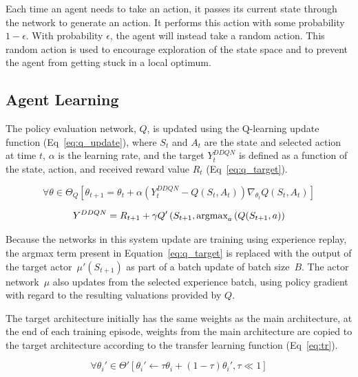 Each time an agent needs to take an action,
it passes its current state through the network to generate an action.
It performs this action with some probability $1 - \epsilon$.
With probability $\epsilon$, the agent will instead take a random action.
This random action is used to encourage exploration of the state space
and to prevent the agent from getting stuck in a local optimum.

\subsection{Agent Learning}
\label{subsec:farm_methods_learning}

The policy evaluation network, $Q$, is updated using the Q-learning
update function (Eq~\ref{eq:q_update}), where
$S_t$ and $A_t$ are the state and selected action at time $t$,
$\alpha$ is the learning rate,
and the target $Y_t^{DDQN}$ is defined as a function of the
state, action, and received reward value $R_t$ (Eq~\ref{eq:q_target}).

\begin{equation}
\label{eq:q_update}
    \forall \theta \in \Theta_Q \left[
    \theta_{t+1} = \theta_t + \alpha\left(
    Y_t^{DDQN} - Q(S_t, A_t)
    \right)
    \nabla_{\theta_t}Q(S_t,A_t)
    \right]
\end{equation}

\begin{equation}
\label{eq:q_target}
    Y^{DDQN} = 
        R_{t+1}
        + \gamma Q'\left(S_{t+1},\text{argmax}_{a}\left(Q(S_{t+1}, a\right)\right)
\end{equation}

Because the networks in this system update are training
using experience replay, the argmax term present in 
Equation~\ref{eq:q_target} is replaced with the output of the 
target actor~$\mu'(S_{t+1})$ as part of a batch update of 
batch size~$B$.
The actor network~$\mu$ also updates from the selected
experience batch, using policy gradient with regard to
the resulting valuations provided by $Q$.

The target architecture initially has the same weights as
the main architecture, at the end of each training episode,
weights from the main architecture are copied to the target
architecture according to the transfer learning function
(Eq~\ref{eq:tr}).

\begin{equation}
    \label{eq:tr}
    \forall\theta_i'\in\Theta'\left[
        \theta_i'\leftarrow\tau\theta_i+\left(1-\tau\right)\theta_i',
        \tau \ll 1
    \right]
\end{equation}


